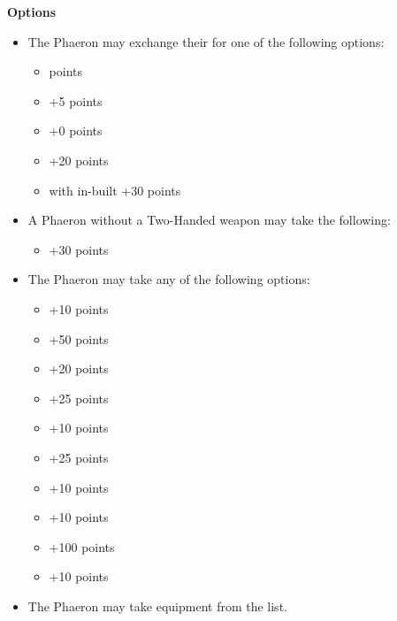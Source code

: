 \begin{minipage}[t]{0.72\textwidth}
	\vspace*{2em}
	\textbf{Options}
	\begin{itemize}
		\item The Phaeron may exchange their  for one of the following options:
		\begin{itemize}			
			\item {}  points
			\item {} \dotfill +5 points
			\item {} \dotfill +0 points
			\item {} \dotfill +20 points
			\item {} with in-built  \dotfill +30 points
		\end{itemize}
		\item A Phaeron without a Two-Handed weapon may take the following:
		\begin{itemize}
			\item {} \dotfill +30 points
		\end{itemize}
		\item The Phaeron may take any of the following options:
		\begin{itemize}
			\item {} \dotfill +10 points
			\item {} \dotfill +50 points
			\item {} \dotfill +20 points
			\item {} \dotfill +25 points
			\item {} \dotfill +10 points
			\item {} \dotfill +25 points
			\item {} \dotfill +10 points
			\item {} \dotfill +10 points
			\item {} \dotfill +100 points
			\item {} \dotfill +10 points
		\end{itemize}
		\item The Phaeron may take equipment from the  list.
	\end{itemize}
\end{minipage}
\hspace{0.5em}

